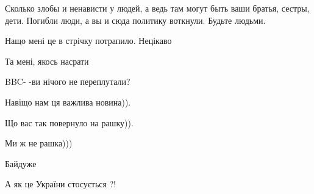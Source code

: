 \begin{itemize}
Сколько злобы и ненависти у людей, а ведь там могут быть ваши братья,
сестры, дети. Погибли люди, а вы и сюда политику воткнули. Будьте людьми.


 
Нащо мені це в стрічку потрапило. Нецікаво

 
Та мені, якось насрати

 
BBC- -ви нічого не переплутали?


 

Навіщо нам ця важлива новина)).

Що вас так повернуло на рашку)).

Ми ж не рашка)))

 
Байдуже

 
А як це України стосується ?!

 

\end{itemize}
